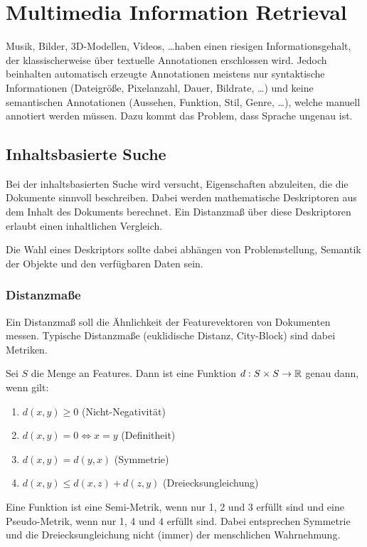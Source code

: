 	\chapter{Multimedia Information Retrieval}
		Musik, Bilder, 3D-Modellen, Videos, \dots haben einen riesigen Informationsgehalt, der klassischerweise über textuelle Annotationen erschlossen wird. Jedoch beinhalten automatisch erzeugte Annotationen meistens nur syntaktische Informationen (Dateigröße, Pixelanzahl, Dauer, Bildrate, \dots) und keine semantischen Annotationen (Aussehen, Funktion, Stil, Genre, \dots), welche manuell annotiert werden müssen. Dazu kommt das Problem, dass Sprache \iA ungenau ist.

		\section{Inhaltsbasierte Suche}
			Bei der inhaltsbasierten Suche wird versucht, Eigenschaften abzuleiten, die die Dokumente sinnvoll beschreiben. Dabei werden mathematische Deskriptoren aus dem Inhalt des Dokuments berechnet. Ein Distanzmaß über diese Deskriptoren erlaubt einen inhaltlichen Vergleich.

			Die Wahl eines Deskriptors sollte dabei abhängen von Problemstellung, Semantik der Objekte und den verfügbaren Daten sein.

			\subsection{Distanzmaße}
				Ein Distanzmaß soll die Ähnlichkeit der Featurevektoren von Dokumenten messen. Typische Distanzmaße (euklidische Distanz, City-Block) sind dabei Metriken.

				Sei \(S\) die Menge an Features. Dann ist eine Funktion \( d : S \times S \to \mathbb{R} \) genau dann, wenn gilt:
				\begin{enumerate}
					\item \( d(x, y) \geq 0 \) (Nicht-Negativität)
					\item \( d(x, y) = 0 \iff x = y \) (Definitheit)
					\item \( d(x, y) = d(y, x) \) (Symmetrie)
					\item \( d(x, y) \leq d(x, z) + d(z, y) \) (Dreiecksungleichung)
				\end{enumerate}
				Eine Funktion ist eine Semi-Metrik, wenn nur 1, 2 und 3 erfüllt sind und eine Pseudo-Metrik, wenn nur 1, 4 und 4 erfüllt sind. Dabei entsprechen Symmetrie und die Dreiecksungleichung nicht (immer) der menschlichen Wahrnehmung.

